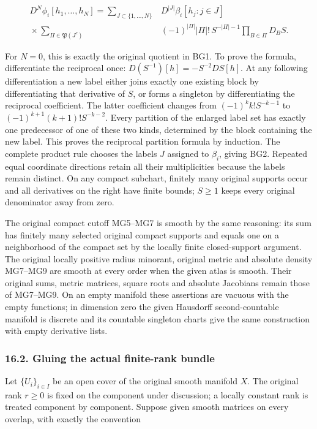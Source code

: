 \documentclass[
  11pt,
]{article}
\begin{document}
\[
 \begin{aligned}
 D^N\phi_i[h_1,\ldots,h_N]
 =\sum_{J\subset\{1,\ldots,N\}}
 &D^{|J|}\beta_i[h_j:j\in J]\\
 {}\times\sum_{\Pi\in\mathfrak P(J^c)}
 &(-1)^{|\Pi|}|\Pi|!\,S^{-|\Pi|-1}
       \prod_{B\in\Pi}D_BS .
 \end{aligned}
 \tag{BG2}
\]

For \(N=0\), this is exactly the original quotient in BG1. To prove the
formula, differentiate the reciprocal once:
\(D(S^{-1})[h]=-S^{-2}DS[h]\). At any following differentiation a new
label either joins exactly one existing block by differentiating that
derivative of \(S\), or forms a singleton by differentiating the
reciprocal coefficient. The latter coefficient changes from
\((-1)^k k!S^{-k-1}\) to \((-1)^{k+1}(k+1)!S^{-k-2}\). Every partition
of the enlarged label set has exactly one predecessor of one of these
two kinds, determined by the block containing the new label. This proves
the reciprocal partition formula by induction. The complete product rule
chooses the labels \(J\) assigned to \(\beta_i\), giving BG2. Repeated
equal coordinate directions retain all their multiplicities because the
labels remain distinct. On any compact subchart, finitely many original
supports occur and all derivatives on the right have finite bounds;
\(S\geq1\) keeps every original denominator away from zero.

The original compact cutoff MG5--MG7 is smooth by the same reasoning:
its sum has finitely many selected original compact supports and equals
one on a neighborhood of the compact set by the locally finite
closed-support argument. The original locally positive radius minorant,
original metric and absolute density MG7--MG9 are smooth at every order
when the given atlas is smooth. Their original sums, metric matrices,
square roots and absolute Jacobians remain those of MG7--MG9. On an
empty manifold these assertions are vacuous with the empty functions; in
dimension zero the given Hausdorff second-countable manifold is discrete
and its countable singleton charts give the same construction with empty
derivative lists.

\subsubsection{16.2. Gluing the actual finite-rank
bundle}\label{gluing-the-actual-finite-rank-bundle}

Let \(\{U_i\}_{i\in I}\) be an open cover of the original smooth
manifold \(X\). The original rank \(r\geq0\) is fixed on the component
under discussion; a locally constant rank is treated component by
component. Suppose given smooth matrices on every overlap, with exactly
the convention
\end{document}
